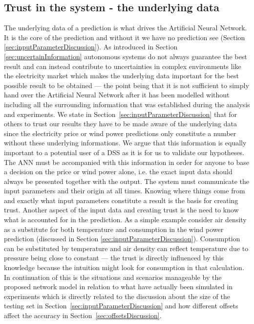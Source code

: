 \subsection{Trust in the system - the underlying data}
The underlying data of a prediction is what drives the Artificial Neural Network. It is the core of the prediction and without it we have no prediction see (Section \ref{sec:inputParameterDiscussion}). As introduced in Section \ref{sec:uncertainInformation} autonomous systems do not always guarantee the best result and can instead contribute to uncertainties in complex environments like the electricity market which makes the underlying data important for the best possible result to be obtained --- the point being that it is not sufficient to simply hand over the Artificial Neural Network after it has been modelled without including all the surrounding information that was established during the analysis and experiments. We state in Section~\ref{sec:inputParameterDiscussion} that for others to trust our results they have to be made aware of the underlying data since the electricity price or wind power predictions only constitute a number without these underlying informations. We argue that this information is equally important to a potential user of a DSS as it is for us to validate our hypotheses. The ANN must be accompanied with this information in order for anyone to base a decision on the price or wind power alone, i.e. the exact input data should always be presented together with the output. The system must communicate the input parameters and their origin at all times. Knowing where things come from and exactly what input parameters constitute a result is the basis for creating trust. Another aspect of the input data and creating trust is the need to know what is accounted for in the prediction. As a simple example consider air density as a substitute for both temperature and consumption in the wind power prediction (discussed in Section \ref{sec:inputParameterDiscussion}). Consumption can be substituted by temperature and air density can reflect temperature due to pressure being close to constant --- the trust is directly influenced by this knowledge because the intuition might look for consumption in that calculation. In continuation of this is the situations and scenarios manageable by the proposed network model in relation to what have actually been simulated in experiments which is directly related to the discussion about the size of the testing set in Section~\ref{sec:inputParameterDiscussion} and how different offsets affect the accuracy in Section~\ref{sec:offsetsDiscussion}. 
 
